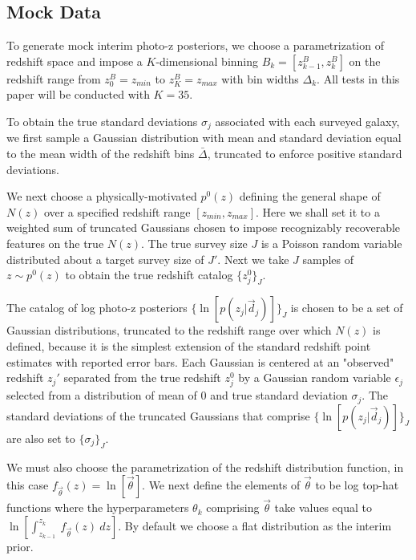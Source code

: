 \documentclass[preprint]{aastex}
\begin{document}
\subsection{Mock Data}
\label{sec:mock}

To generate mock interim photo-z posteriors, we choose a parametrization of 
redshift space and impose a $K$-dimensional binning 
$B_{k}=[z^{B}_{k-1},z^{B}_{k}]$ on the redshift range from $z^{B}_{0}=z_{min}$ 
to $z^{B}_{K}=z_{max}$ with bin widths $\Delta_{k}$.  All tests in this paper 
will be conducted with $K=35$.  

To obtain the true standard deviations $\sigma_{j}$ associated with each 
surveyed galaxy, we first sample a Gaussian distribution with mean and standard 
deviation equal to the mean width of the redshift bins $\bar{\Delta}$, 
truncated to enforce positive standard deviations.

We next choose a physically-motivated $p^{0}(z)$ defining the general shape of 
$N(z)$ over a specified redshift range $[z_{min},z_{max}]$.  Here we shall set 
it to a weighted sum of truncated Gaussians chosen to impose recognizably 
recoverable features on the true $N(z)$.  The true survey size $J$ is a Poisson 
random variable distributed about a target survey size of $J'$.  Next we take 
$J$ samples of $z\sim p^{0}(z)$ to obtain the true redshift catalog 
$\{z_{j}^{0}\}_{J}$.  

The catalog of log photo-z posteriors $\{\ln[p(z_{j}|\vec{d}_{j})]\}_{J}$ is 
chosen to be a set of Gaussian distributions, truncated to the redshift range 
over which $N(z)$ is defined, because it is the simplest extension of the 
standard redshift point estimates with reported error bars.  Each Gaussian is 
centered at an "observed" redshift $z_{j}'$ separated from the true redshift 
$z_{j}^{0}$ by a Gaussian random variable $\epsilon_{j}$ selected from a 
distribution of mean of 0 and true standard deviation $\sigma_{j}$.  The 
standard deviations of the truncated Gaussians that comprise 
$\{\ln[p(z_{j}|\vec{d}_{j})]\}_{J}$ are also set to $\{\sigma_{j}\}_{J}$.

We must also choose the parametrization of the redshift distribution function, 
in this case $f_{\vec{\theta}}(z)=\ln[\vec{\theta}]$.  We next define the 
elements of $\vec{\theta}$ to be log top-hat functions where the 
hyperparameters $\theta_{k}$ comprising $\vec{\theta}$ take values equal to 
$\ln[\int_{z_{k-1}}^{z_{k}}\ f_{\vec{\theta}}(z)\ dz]$.  By default we choose a 
flat distribution as the interim prior.
\end{document}
